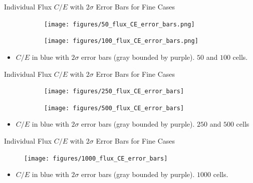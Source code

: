 \documentclass[9pt,t]{beamer}
\begin{document}
\begin{frame}{Individual Flux $C/E$ with $2\sigma$ Error Bars for Fine Cases}
    \begin{figure}[T]
        \hspace*{-1.1cm}
        \begin{subfigure}{0.495\textwidth}
            \texttt{[image: figures/50\_flux\_CE\_error\_bars.png]}
        \end{subfigure}\hspace*{0.89cm}
        \begin{subfigure}{0.495\textwidth}
            \texttt{[image: figures/100\_flux\_CE\_error\_bars.png]}
        \end{subfigure}
    \end{figure}
    \begin{itemize}
        \item $C/E$ in blue with $2\sigma$ error bars (gray bounded by purple). $50$ and $100$ cells.
    \end{itemize}
\end{frame}

\begin{frame}{Individual Flux $C/E$ with $2\sigma$ Error Bars for Fine Cases}
    \begin{figure}[T]
        \hspace*{-1.1cm}
        \begin{subfigure}{0.495\textwidth}
            \texttt{[image: figures/250\_flux\_CE\_error\_bars]}
        \end{subfigure}\hspace*{0.89cm}
        \begin{subfigure}{0.495\textwidth}
            \texttt{[image: figures/500\_flux\_CE\_error\_bars]}
        \end{subfigure}
    \end{figure}
    \begin{itemize}
        \item $C/E$ in blue with $2\sigma$ error bars (gray bounded by purple). $250$ and $500$ cells
    \end{itemize}
\end{frame}

\begin{frame}{Individual Flux $C/E$ with $2\sigma$ Error Bars for Fine Cases}
    \begin{figure}[T]
        \centering
        \texttt{[image: figures/1000\_flux\_CE\_error\_bars]}
    \end{figure}
    \begin{itemize}
        \item $C/E$ in blue with $2\sigma$ error bars (gray bounded by purple). $1000$ cells.
    \end{itemize}
\end{frame}
\end{document}
